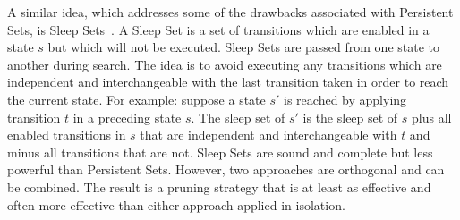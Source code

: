 A similar idea, which addresses some of the drawbacks associated with Persistent Sets, is 
Sleep Sets~\citep{godefroid93,godefroid96}. A Sleep Set is a set of transitions which are
enabled in a state $s$ but which will not be executed. Sleep Sets are passed from one state to 
another during search. The idea is to avoid executing any transitions which are independent and
interchangeable with the last transition taken in order to reach the current state.
For example: suppose a state $s'$ is reached by applying transition $t$ in a preceding state $s$.
The sleep set of $s'$ is the sleep set of $s$ plus all enabled transitions in $s$ that 
are independent and interchangeable with $t$ and minus all transitions that are not.
Sleep Sets are sound and complete but less powerful than Persistent Sets. However, two approaches 
are orthogonal and can be combined. The result is a pruning strategy that is at least as effective
and often more effective than either approach applied in isolation.

